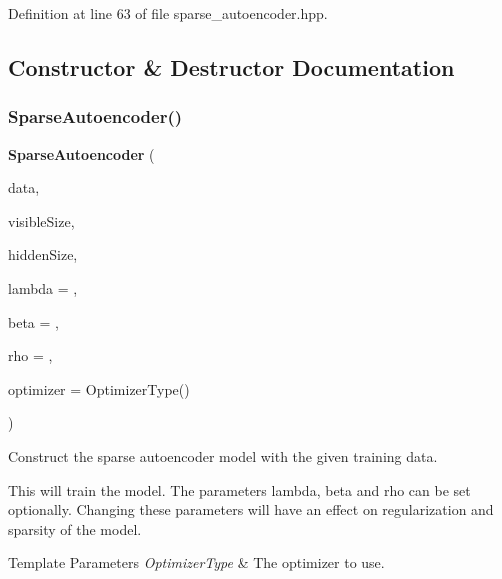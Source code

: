 Definition at line 63 of file sparse\+\_\+autoencoder.\+hpp.



\subsection{Constructor \& Destructor Documentation}
\mbox{\label{classmlpack_1_1nn_1_1SparseAutoencoder_a5fbf00d7a7ca616f6128c15d72dac06f}} 
\subsubsection{Sparse\+Autoencoder()\hspace{0.1cm}{\footnotesize\ttfamily [1/2]}}
{\footnotesize\ttfamily \textbf{ Sparse\+Autoencoder} (\begin{DoxyParamCaption}\item[{const arma\+::mat \&}]{data,  }\item[{const size\+\_\+t}]{visible\+Size,  }\item[{const size\+\_\+t}]{hidden\+Size,  }\item[{const double}]{lambda = {},  }\item[{const double}]{beta = {},  }\item[{const double}]{rho = {},  }\item[{Optimizer\+Type}]{optimizer = {\ttfamily OptimizerType()} }\end{DoxyParamCaption})}



Construct the sparse autoencoder model with the given training data. 

This will train the model. The parameters \textquotesingle{}lambda\textquotesingle{}, \textquotesingle{}beta\textquotesingle{} and \textquotesingle{}rho\textquotesingle{} can be set optionally. Changing these parameters will have an effect on regularization and sparsity of the model.


\begin{DoxyTemplParams}{Template Parameters}
{\em Optimizer\+Type} & The optimizer to use. \\
\hline
\end{DoxyTemplParams}

